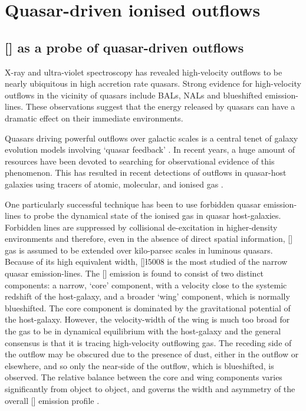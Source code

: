 
\chapter{Quasar-driven ionised outflows}
\label{ch:nlr} 

\section{[] as a probe of quasar-driven outflows}

X-ray and ultra-violet spectroscopy has revealed high-velocity outflows to be nearly ubiquitous in high accretion rate quasars.
Strong evidence for high-velocity outflows in the vicinity of quasars include BALs, NALs and blueshifted emission-lines. 
These observations suggest that the energy released by quasars can have a dramatic effect on their immediate environments. 

Quasars driving powerful outflows over galactic scales is a central tenet of galaxy evolution models involving `quasar feedback' \citep[e.g.][]{silk98,springel05,bower06}.
In recent years, a huge amount of resources have been devoted to searching for observational evidence of this phenomenon.  
This has resulted in recent detections of outflows in quasar-host galaxies using tracers of atomic, molecular, and ionised gas \citep[e.g.][]{nesvadba06,arav08,nesvadba08,moe09,alexander10,dunn10,feruglio10,nesvadba10,alatalo11,cano-diaz12,harrison12,harrison14,cimatti13,rupke13,veilleux13,cicone14,nardini15}.  

One particularly successful technique has been to use forbidden quasar emission-lines to probe the dynamical state of the ionised gas in quasar host-galaxies. 
Forbidden lines are suppressed by collisional de-excitation in higher-density environments and therefore, even in the absence of direct spatial information, [] gas is assumed to be extended over kilo-parsec scales in luminous quasars. 
Because of its high equivalent width, []\l$5008$ is the most studied of the narrow quasar emission-lines. 
The [] emission is found to consist of two distinct components: a narrow, `core' component, with a velocity close to the systemic redshift of the host-galaxy, and a broader `wing' component, which is normally blueshifted. 
The core component is dominated by the gravitational potential of the host-galaxy.
However, the velocity-width of the wing is much too broad for the gas to be in dynamical equilibrium with the host-galaxy \citep[e.g.][]{liu13} and the general consensus is that it is tracing high-velocity outflowing gas. The receding side of the outflow may be obscured due to the presence of dust, either in the outflow or elsewhere, and so only the near-side of the outflow, which is blueshifted, is observed. 
The relative balance between the core and wing components varies significantly from object to object, and governs the width and asymmetry of the overall [] emission profile \citep[e.g.][]{shen14}. 

